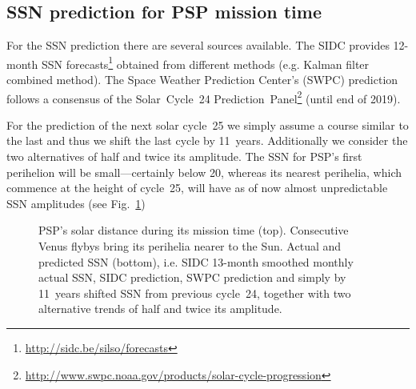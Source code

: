 \subsection{SSN prediction for PSP mission time}
For the SSN prediction there are several sources available. The SIDC provides 12-month SSN forecasts\footnote{\url{http://sidc.be/silso/forecasts}} obtained from different methods (e.g. Kalman filter combined method). The Space Weather Prediction Center's (SWPC) prediction follows a consensus of the Solar~Cycle~24 Prediction~Panel\footnote{\url{http://www.swpc.noaa.gov/products/solar-cycle-progression}} (until end of 2019).

For the prediction of the next solar cycle~25 we simply assume a course similar to the last and thus we shift the last cycle by 11~years. Additionally we consider the two alternatives of half and twice its amplitude. The SSN for PSP's first perihelion will be small---certainly below 20, whereas its nearest perihelia, which commence at the height of cycle~25, will have as of now almost unpredictable SSN amplitudes (see Fig.~\ref{fig:SPP_orbit_predicted_SSN_overview_d_plot})\\
\begin{figure}
	\caption{PSP's solar distance during its mission time (top). Consecutive Venus flybys bring its perihelia nearer to the Sun. Actual and predicted SSN (bottom), i.e. SIDC 13-month smoothed monthly actual SSN, SIDC prediction, SWPC prediction and simply by 11~years shifted SSN from previous cycle~24, together with two alternative trends of half and twice its amplitude.}
	\label{fig:SPP_orbit_predicted_SSN_overview_d_plot}
\end{figure}

